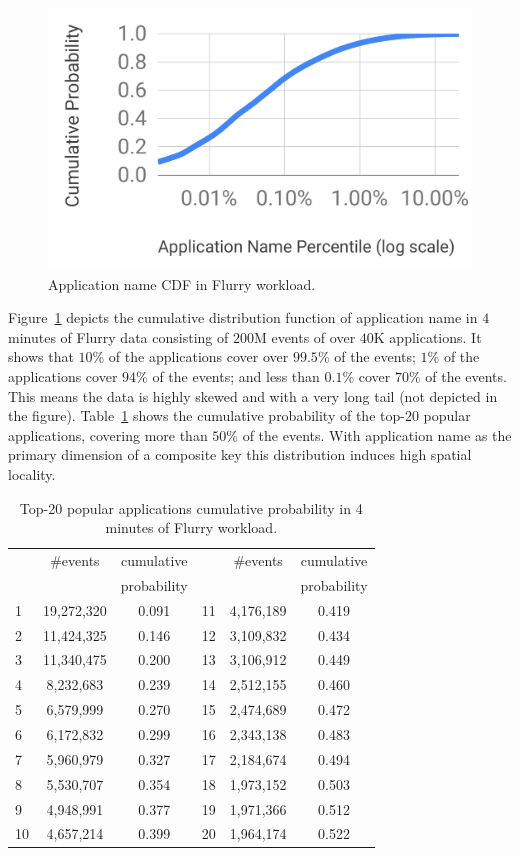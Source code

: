 \begin{figure}[tb]
\centering
\includegraphics[width=0.8\columnwidth]{figs/cdf.pdf}
\caption{
{Application name CDF in Flurry workload.}
}
\label{fig:cdf}
\end{figure}
Figure~\ref{fig:cdf} depicts the cumulative distribution function of application name in $4$ minutes of Flurry data consisting of $200$M events of over $40$K applications.
It shows that $10$\% of the applications cover over $99.5$\% of the events; $1$\% of the applications cover $94$\% of the events; and less than $0.1$\% cover $70$\% of the events. This means the data is highly skewed and with a very long tail (not depicted in the figure).
Table~\ref {table:popular} shows the cumulative probability of the top-$20$ popular applications, covering more than $50$\% of the events. 
With application name as the primary dimension of a composite key this distribution induces high spatial locality.


\begin{table}[tb]
\center
{\footnotesize{
\begin{tabular}{|l|c|c||l|c|c|}
\hline 
  & \#events & cumulative &  & \#events & cumulative  \\
  &  &  probability& &  &  probability \\
\hline 
1 & 19,272,320 & 0.091 &11 & 4,176,189 & 0.419\\
2 & 11,424,325 & 0.146&12 & 3,109,832 & 0.434\\
3 & 11,340,475  & 0.200&13 & 3,106,912 & 0.449\\
4& 8,232,683 &0.239 &14 & 2,512,155 & 0.460\\
5& 6,579,999 &0.270 &15& 2,474,689 & 0.472\\
6& 6,172,832 & 0.299&16 & 2,343,138 & 0.483\\
7& 5,960,979 & 0.327&17 & 2,184,674 &0.494 \\
8 & 5,530,707& 0.354&18 & 1,973,152& 0.503\\
9& 4,948,991 & 0.377&19 & 1,971,366& 0.512\\
10 & 4,657,214 & 0.399&20 & 1,964,174& 0.522\\
\hline 
\end{tabular}
}}
\caption{{Top-20 popular applications cumulative probability in 4 minutes of Flurry workload.}}
\label{table:popular}
\end{table}



